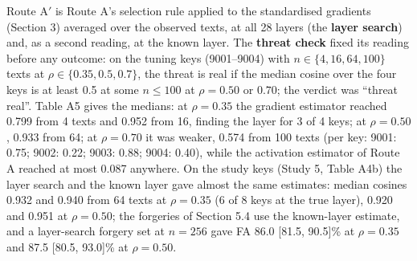 \documentclass[11pt,letterpaper]{article}
\begin{document}
Route A\ensuremath{'} is Route A's selection rule applied to the standardised gradients (Section 3) averaged over the observed texts, at all 28 layers (the \textbf{layer search}) and, as a second reading, at the known layer. The \textbf{threat check} fixed its reading before any outcome: on the tuning keys (9001--9004) with \(n \in \{4, 16, 64, 100\}\) texts at \(\rho \in \{0.35, 0.5, 0.7\}\), the threat is real if the median cosine over the four keys is at least 0.5 at some \(n \leq 100\) at \(\rho = 0.50\) or \(0.70\); the verdict was ``threat real''. Table A5 gives the medians: at \(\rho = 0.35\) the gradient estimator reached 0.799 from 4 texts and 0.952 from 16, finding the layer for 3 of 4 keys; at \(\rho = 0.50\), 0.933 from 64; at \(\rho = 0.70\) it was weaker, 0.574 from 100 texts (per key: 9001: 0.75; 9002: 0.22; 9003: 0.88; 9004: 0.40), while the activation estimator of Route A reached at most 0.087 anywhere. On the study keys (Study 5, Table A4b) the layer search and the known layer gave almost the same estimates: median cosines 0.932 and 0.940 from 64 texts at \(\rho = 0.35\) (6 of 8 keys at the true layer), 0.920 and 0.951 at \(\rho = 0.50\); the forgeries of Section 5.4 use the known-layer estimate, and a layer-search forgery set at \(n = 256\) gave FA 86.0 {[}81.5, 90.5{]}\% at \(\rho = 0.35\) and 87.5 {[}80.5, 93.0{]}\% at \(\rho = 0.50\).
\end{document}
